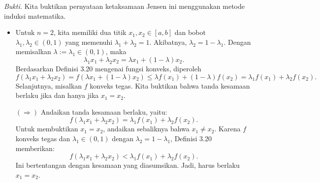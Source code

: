 \documentclass[aspectratio=169,11pt]{beamer}
\theoremstyle{definition}
\begin{document}
\begin{frame}[allowframebreaks]{\insertsection}{\insertsubsection}
  \textit{Bukti.}
  Kita buktikan pernyataan ketaksamaan Jensen ini menggunakan metode induksi matematika.

  \begin{itemize}
    \item  Untuk $n = 2$, kita memiliki dua titik $x_1, x_2 \in [a,b]$ dan bobot $\lambda_1, \lambda_2 \in (0,1)$ yang memenuhi $\lambda_1 + \lambda_2 = 1$. Akibatnya, $\lambda_2 = 1 - \lambda_1$.
          Dengan memisalkan $\lambda := \lambda_1 \in (0,1)$, maka
          \begin{equation*}
            \lambda_1 x_1 + \lambda_2 x_2 = \lambda x_1 + (1 - \lambda) x_2.
          \end{equation*}
          Berdasarkan Definisi 3.20 mengenai fungsi konveks, diperoleh
          \begin{equation*}
            f(\lambda_1 x_1 + \lambda_2 x_2) = f(\lambda x_1 + (1 - \lambda) x_2) \leq \lambda f(x_1) + (1 - \lambda) f(x_2) = \lambda_1 f(x_1) + \lambda_2 f(x_2).
          \end{equation*}
          Selanjutnya, misalkan $f$ konveks tegas. Kita buktikan bahwa tanda kesamaan berlaku jika dan hanya jika $x_1=x_2$.

          $(\Rightarrow)$ Andaikan tanda kesamaan berlaku, yaitu:
          \begin{equation*}
            f(\lambda_1x_1+\lambda_2x_2)=\lambda_1f(x_1)+\lambda_2f(x_2).
          \end{equation*}
          Untuk membuktikan $x_1=x_2$, andaikan sebaliknya bahwa $x_1\neq x_2$. Karena $f$ konveks tegas dan $\lambda_1\in(0,1)$ dengan $\lambda_2=1-\lambda_1$, Definisi 3.20 memberikan:
          \begin{equation*}
            f(\lambda_1x_1+\lambda_2x_2)
            <\lambda_1f(x_1)+\lambda_2f(x_2).
          \end{equation*}
          Ini bertentangan dengan kesamaan yang diasumsikan. Jadi, harus berlaku $x_1=x_2$.


\end{itemize}
\end{frame}
\end{document}
